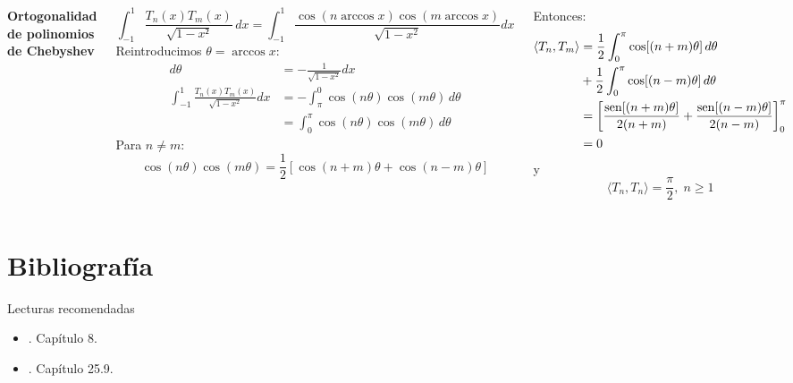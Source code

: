 \documentclass[9pt, aspectratio=169]{beamer}
\begin{document}
\begin{frame}
\begin{columns}[t]
\cx
\textbf{ Ortogonalidad de polinomios de Chebyshev }

\[ \int_{-1}^1 \frac{T_n(x) T_m(x)}{\sqrt{1 - x²}} \, dx = \int_{-1}^1 \frac{\cos(n \arccos x) \cos(m \arccos x)}{\sqrt{1 - x^2}} dx \]
Reintroducimos $\theta = \arccos x$:
\begin{align*}
d\theta &= -\frac{1}{\sqrt{1 - x^2}} dx \\
\int_{-1}^1 \frac{T_n(x) T_m(x)}{\sqrt {1 - x^2}} dx &= -\int_{\pi}^0 \cos(n \theta) \cos(m \theta) \, d\theta \\
  &= \int_{0}^{\pi} \cos(n \theta) \cos(m \theta) \, d\theta 
\end{align*}
Para $n \neq m$:
\[ \cos(n \theta) \cos(m \theta) = \frac{1}{2}[\cos(n+m) \theta + \cos(n-m)\theta] \]

\vspace{7em}

Entonces:
\begin{align*}
    \langle T_n, T_m \rangle &= \frac{1}{2} \int_0^{\pi} \cos[(n+m) \theta] \, d\theta \\
      &+\frac{1}{2} \int_0^{\pi} \cos[(n-m) \theta] \, d\theta \\
      &= \left[ \frac{\operatorname{sen}[(n+m) \theta]}{2(n+m)} + \frac{\operatorname{sen}[(n-m) \theta]}{2(n-m)} \right]_0^{\pi}  \\
      &= 0
\end{align*}
y
\[ \langle T_n, T_n \rangle =  \frac{\pi}{2}, \; n \geq 1 \]


\end{columns}
\end{frame}




\section*{Bibliografía}
\begin{frame}[allowframebreaks]{Lecturas recomendadas}
\begin{itemize}
    \item {}. Capítulo 8.
    \item {}. Capítulo 25.9.
\end{itemize}
\end{frame}
\end{document}
